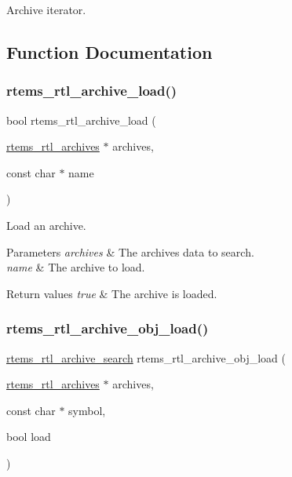 Archive iterator. 

\subsection{Function Documentation}
\mbox{\label{rtl-archive_8c_aec513bfd77432b5004d1a4ed91b7bc3d}} 
\subsubsection{\texorpdfstring{rtems\_rtl\_archive\_load()}{rtems\_rtl\_archive\_load()}}
{\footnotesize\ttfamily bool rtems\+\_\+rtl\+\_\+archive\+\_\+load (\begin{DoxyParamCaption}\item[{\mbox{\hyperlink{structrtems__rtl__archives}{rtems\+\_\+rtl\+\_\+archives}} $\ast$}]{archives,  }\item[{const char $\ast$}]{name }\end{DoxyParamCaption})}

Load an archive.


\begin{DoxyParams}{Parameters}
{\em archives} & The archives data to search. \\
\hline
{\em name} & The archive to load. \\
\hline
\end{DoxyParams}

\begin{DoxyRetVals}{Return values}
{\em true} & The archive is loaded. \\
\hline
\end{DoxyRetVals}
\mbox{\label{rtl-archive_8c_a48e3be1af298eca62a62e5f1bc72c916}} 
\subsubsection{\texorpdfstring{rtems\_rtl\_archive\_obj\_load()}{rtems\_rtl\_archive\_obj\_load()}}
{\footnotesize\ttfamily \mbox{\hyperlink{rtl-archive_8h_a82930c14e64f3f5853052e84af4a6c2e}{rtems\+\_\+rtl\+\_\+archive\+\_\+search}} rtems\+\_\+rtl\+\_\+archive\+\_\+obj\+\_\+load (\begin{DoxyParamCaption}\item[{\mbox{\hyperlink{structrtems__rtl__archives}{rtems\+\_\+rtl\+\_\+archives}} $\ast$}]{archives,  }\item[{const char $\ast$}]{symbol,  }\item[{bool}]{load }\end{DoxyParamCaption})}

